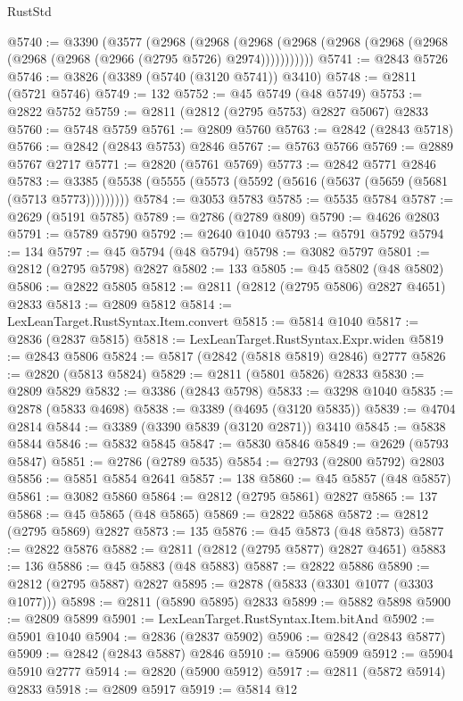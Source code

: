 \begin{lexlean}{RustStd}
\begin{coremodule}
@5740 := @3390
    (@3577
      (@2968
        (@2968
          (@2968 (@2968 (@2968 (@2968 (@2968 (@2968 (@2968 (@2966 (@2795 @5726) @2974)))))))))))
@5741 := @2843 @5726
@5746 := @3826 (@3389 (@5740 (@3120 @5741)) @3410)
@5748 := @2811 (@5721 @5746)
@5749 := 132
@5752 := @45 @5749 (@48 @5749)
@5753 := @2822 @5752
@5759 := @2811 (@2812 (@2795 @5753) @2827 @5067) @2833
@5760 := @5748 @5759
@5761 := @2809 @5760
@5763 := @2842 (@2843 @5718)
@5766 := @2842 (@2843 @5753) @2846
@5767 := @5763 @5766
@5769 := @2889 @5767 @2717
@5771 := @2820 (@5761 @5769)
@5773 := @2842 @5771 @2846
@5783 := @3385 (@5538 (@5555 (@5573 (@5592 (@5616 (@5637 (@5659 (@5681 (@5713 @5773)))))))))
@5784 := @3053 @5783
@5785 := @5535 @5784
@5787 := @2629 (@5191 @5785)
@5789 := @2786 (@2789 @809)
@5790 := @4626 @2803
@5791 := @5789 @5790
@5792 := @2640 @1040
@5793 := @5791 @5792
@5794 := 134
@5797 := @45 @5794 (@48 @5794)
@5798 := @3082 @5797
@5801 := @2812 (@2795 @5798) @2827
@5802 := 133
@5805 := @45 @5802 (@48 @5802)
@5806 := @2822 @5805
@5812 := @2811 (@2812 (@2795 @5806) @2827 @4651) @2833
@5813 := @2809 @5812
@5814 := LexLeanTarget.RustSyntax.Item.convert
@5815 := @5814 @1040
@5817 := @2836 (@2837 @5815)
@5818 := LexLeanTarget.RustSyntax.Expr.widen
@5819 := @2843 @5806
@5824 := @5817 (@2842 (@5818 @5819) @2846) @2777
@5826 := @2820 (@5813 @5824)
@5829 := @2811 (@5801 @5826) @2833
@5830 := @2809 @5829
@5832 := @3386 (@2843 @5798)
@5833 := @3298 @1040
@5835 := @2878 (@5833 @4698)
@5838 := @3389 (@4695 (@3120 @5835))
@5839 := @4704 @2814
@5844 := @3389 (@3390 @5839 (@3120 @2871)) @3410
@5845 := @5838 @5844
@5846 := @5832 @5845
@5847 := @5830 @5846
@5849 := @2629 (@5793 @5847)
@5851 := @2786 (@2789 @535)
@5854 := @2793 (@2800 @5792) @2803
@5856 := @5851 @5854 @2641
@5857 := 138
@5860 := @45 @5857 (@48 @5857)
@5861 := @3082 @5860
@5864 := @2812 (@2795 @5861) @2827
@5865 := 137
@5868 := @45 @5865 (@48 @5865)
@5869 := @2822 @5868
@5872 := @2812 (@2795 @5869) @2827
@5873 := 135
@5876 := @45 @5873 (@48 @5873)
@5877 := @2822 @5876
@5882 := @2811 (@2812 (@2795 @5877) @2827 @4651)
@5883 := 136
@5886 := @45 @5883 (@48 @5883)
@5887 := @2822 @5886
@5890 := @2812 (@2795 @5887) @2827
@5895 := @2878 (@5833 (@3301 @1077 (@3303 @1077)))
@5898 := @2811 (@5890 @5895) @2833
@5899 := @5882 @5898
@5900 := @2809 @5899
@5901 := LexLeanTarget.RustSyntax.Item.bitAnd
@5902 := @5901 @1040
@5904 := @2836 (@2837 @5902)
@5906 := @2842 (@2843 @5877)
@5909 := @2842 (@2843 @5887) @2846
@5910 := @5906 @5909
@5912 := @5904 @5910 @2777
@5914 := @2820 (@5900 @5912)
@5917 := @2811 (@5872 @5914) @2833
@5918 := @2809 @5917
@5919 := @5814 @12

\end{coremodule}
\end{lexlean}
